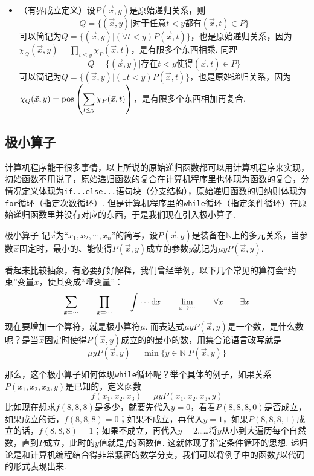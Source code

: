 \begin{itemize}
    如果\(g_1,g_2,P\)都是原始递归的，那么\(f\)也是原始递归的，因为\(f = g_1\chi_P+g_2\chi_{\bar P}\). 类似地，更多种情况也是如此.
    \item （有界成立定义）设\(P(\vec x, y)\)是原始递归关系，则
    \[Q = \{(\vec x, y) | \mbox{对于任意}t<y\mbox{都有}(\vec x, t) \in P\}\]
    可以简记为\(Q = \{(\vec x, y)|(\forall t < y)P(\vec x,t)\}\)，也是原始递归关系，因为\(\displaystyle{\chi_Q(\vec x, y) = \prod_{t \leq y}\chi_P(\vec x,t)}\)，是有限多个东西相乘. 同理
    \[Q = \{(\vec x, y) | \mbox{存在}t<y\mbox{使得}(\vec x, t) \in P\}\]
    可以简记为\(Q = \{(\vec x, y)|(\exists t < y)P(\vec x,t)\}\)，也是原始递归关系，因为\(\displaystyle{\chi_Q(\vec x, y) = {\rm pos}\left(\sum_{t \leq y}\chi_P(\vec x,t)\right)}\)，是有限多个东西相加再复合.
\end{itemize}

\subsection{极小算子}

计算机程序能干很多事情，以上所说的原始递归函数都可以用计算机程序来实现，初始函数不用说了，原始递归函数的复合在计算机程序里也体现为函数的复合，分情况定义体现为\lstinline|if...else...|语句块（分支结构），原始递归函数的归纳则体现为\lstinline|for|循环（指定次数循环）. 但是计算机程序里的\lstinline|while|循环（指定条件循环）在原始递归函数里并没有对应的东西，于是我们现在引入极小算子.

\begin{definition}{极小算子}
    记\(\vec x\)为“\(x_1,x_2,\cdots,x_n\)”的简写，设\(P(\vec x,y)\)是装备在\(\mathbb{N}\)上的多元关系，当参数\(\vec x\)固定时，最小的、能使得\(P(\vec x,y)\)成立的参数\(y\)就记为\(\mu yP(\vec x,y)\).
\end{definition}

看起来比较抽象，有必要好好解释，我们曾经举例，以下几个常见的算符会“约束”变量\(x\)，使其变成“哑变量”：
\[\sum_{x=\cdots} \qquad \prod_{x=\cdots} \qquad \int \cdots {\rm d}x \qquad \lim_{x \to \cdots} \qquad \forall x \qquad \exists x\]
现在要增加一个算符，就是极小算符\(\mu\). 而表达式\(\mu yP(\vec x,y)\)是一个数，是什么数呢？是当\(\vec x\)固定时使得\(P(\vec x,y)\)成立的的最小的数，用集合论语言改写就是
\[\mu y P(\vec x,y) = \min\{y \in \mathbb{N}|P(\vec x,y)\}\]

那么，这个极小算子如何体现\lstinline|while|循环呢？举个具体的例子，如果关系\(P(x_1,x_2,x_3 ,y)\)是已知的，定义函数
\[f(x_1,x_2,x_3) = \mu y P(x_1,x_2,x_3, y)\]
比如现在想求\(f(8,8,8)\)是多少，就要先代入\(y=0\)，看看\(P(8,8,8,0)\)是否成立，如果成立的话，\(f(8,8,8)=0\)；如果不成立，再代入\(y=1\)，如果\(P(8,8,8,1)\)成立的话，\(f(8,8,8)=1\)；如果不成立，再代入\(y=2\)……将\(y\)从小到大遍历每个自然数，直到\(P\)成立，此时的\(y\)值就是\(f\)的函数值. 这就体现了指定条件循环的思想. 递归论是和计算机编程结合得非常紧密的数学分支，我们可以将例子中的函数\(f\)以代码的形式表现出来.

